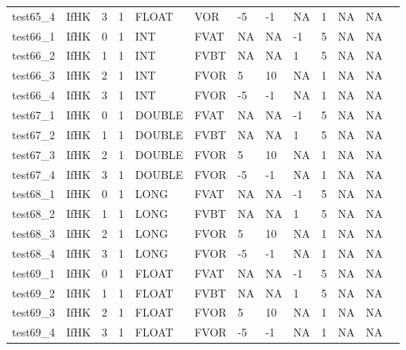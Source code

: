 \begin{longtable}{|l|l|l|p{0.5cm}|p{0.5cm}|l|p{0.5cm}|p{0.5cm}|p{0.5cm}|l|l|p{0.5cm}|l|}
test65\_4 & IfHK & 3 & 1 & FLOAT & VOR & -5 & -1 & NA & 1 & NA & NA \\
test66\_1 & IfHK & 0 & 1 & INT & FVAT & NA & NA & -1 & 5 & NA & NA \\
test66\_2 & IfHK & 1 & 1 & INT & FVBT & NA & NA & 1 & 5 & NA & NA \\
test66\_3 & IfHK & 2 & 1 & INT & FVOR & 5 & 10 & NA & 1 & NA & NA \\
test66\_4 & IfHK & 3 & 1 & INT & FVOR & -5 & -1 & NA & 1 & NA & NA \\
test67\_1 & IfHK & 0 & 1 & DOUBLE & FVAT & NA & NA & -1 & 5 & NA & NA \\
test67\_2 & IfHK & 1 & 1 & DOUBLE & FVBT & NA & NA & 1 & 5 & NA & NA \\
test67\_3 & IfHK & 2 & 1 & DOUBLE & FVOR & 5 & 10 & NA & 1 & NA & NA \\
test67\_4 & IfHK & 3 & 1 & DOUBLE & FVOR & -5 & -1 & NA & 1 & NA & NA \\
test68\_1 & IfHK & 0 & 1 & LONG & FVAT & NA & NA & -1 & 5 & NA & NA \\
test68\_2 & IfHK & 1 & 1 & LONG & FVBT & NA & NA & 1 & 5 & NA & NA \\
test68\_3 & IfHK & 2 & 1 & LONG & FVOR & 5 & 10 & NA & 1 & NA & NA \\
test68\_4 & IfHK & 3 & 1 & LONG & FVOR & -5 & -1 & NA & 1 & NA & NA \\
test69\_1 & IfHK & 0 & 1 & FLOAT & FVAT & NA & NA & -1 & 5 & NA & NA \\
test69\_2 & IfHK & 1 & 1 & FLOAT & FVBT & NA & NA & 1 & 5 & NA & NA \\
test69\_3 & IfHK & 2 & 1 & FLOAT & FVOR & 5 & 10 & NA & 1 & NA & NA \\
test69\_4 & IfHK & 3 & 1 & FLOAT & FVOR & -5 & -1 & NA & 1 & NA & NA \\
\hline
\end{longtable}
\normalsize
